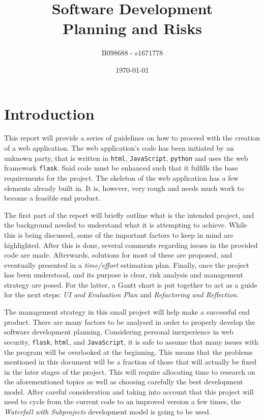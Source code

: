\documentclass[12pt,a4paper]{article}
\begin{document}
\title{Software Development\\Planning and Risks}
\author{B098688 - s1671778}
\date{\today}

\makeEPCCtitle

\thispagestyle{empty}

\newpage


\tableofcontents


\newpage
{}

\section{Introduction}

This report will provide a series of guidelines on how to proceed with the creation of a web application. The web application's code has been initiated by an unknown party, that is written in \texttt{html}, \texttt{JavaScript}, \texttt{python} and uses the web framework \texttt{flask}. Said code must be enhanced such that it fulfills the base requirements for the project. The skeleton of the web application has a few elements already built in. It is, however, very rough and needs much work to become a feasible end product. 

The first part of the report will briefly outline what is the intended project, and the background needed to understand what it is attempting to achieve. While this is being discussed, some of the important factors to keep in mind are highlighted. After this is done, several comments regarding issues in the provided code are made. Afterwards, solutions for most of these are proposed, and eventually presented in a \textit{time/effort} estimation plan. Finally, once the project has been understood, and its purpose is clear, risk analysis and management strategy are posed. For the latter, a Gantt chart is put together to act as a guide for the next steps: \textit{UI and Evaluation Plan} and \textit{Refactoring and Reflection}.

The management strategy in this small project will help make a successful end product. There are many factors to be analysed in order to properly develop the software development planning. Considering personal inexperience in web security, \texttt{flask}, \texttt{html}, and \texttt{JavaScript}, it is safe to assume that many issues with the program will be overlooked at the beginning. This means that the problems mentioned in this document will be a fraction of those that will actually be fixed in the later stages of the project. This will require allocating time to research on the aforementioned topics as well as choosing carefully the best development model. After careful consideration and taking into account that this project will need to cycle from the current code to an improved version a few times, the \textit{Waterfall with Subprojects} development model is going to be used.
\end{document}
